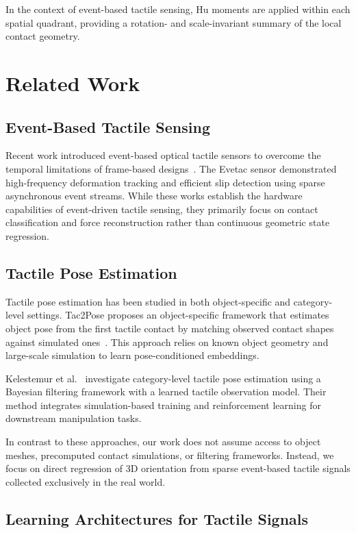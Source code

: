 \documentclass{article}
\begin{document}
    In the context of event-based tactile sensing, Hu moments are applied within each spatial quadrant, providing a rotation- and scale-invariant summary of the local contact geometry.
    \section{Related Work}

    \subsection{Event-Based Tactile Sensing}
    
    Recent work introduced event-based optical tactile sensors to overcome the temporal limitations of frame-based designs~\cite{TacEx}. The Evetac sensor demonstrated high-frequency deformation tracking and efficient slip detection using sparse asynchronous event streams. While these works establish the hardware capabilities of event-driven tactile sensing, they primarily focus on contact classification and force reconstruction rather than continuous geometric state regression.
    
    \subsection{Tactile Pose Estimation}
    
    Tactile pose estimation has been studied in both object-specific and category-level settings. Tac2Pose proposes an object-specific framework that estimates object pose from the first tactile contact by matching observed contact shapes against simulated ones~\cite{DBLP:journals/ijrr/BauzaBR23}. This approach relies on known object geometry and large-scale simulation to learn pose-conditioned embeddings.
    
    Kelestemur et al.~\cite{Kelestemur} investigate category-level tactile pose estimation using a Bayesian filtering framework with a learned tactile observation model. Their method integrates simulation-based training and reinforcement learning for downstream manipulation tasks.
    
    In contrast to these approaches, our work does not assume access to object meshes, precomputed contact simulations, or filtering frameworks. Instead, we focus on direct regression of 3D orientation from sparse event-based tactile signals collected exclusively in the real world.
    
    \subsection{Learning Architectures for Tactile Signals}
    
\end{document}
